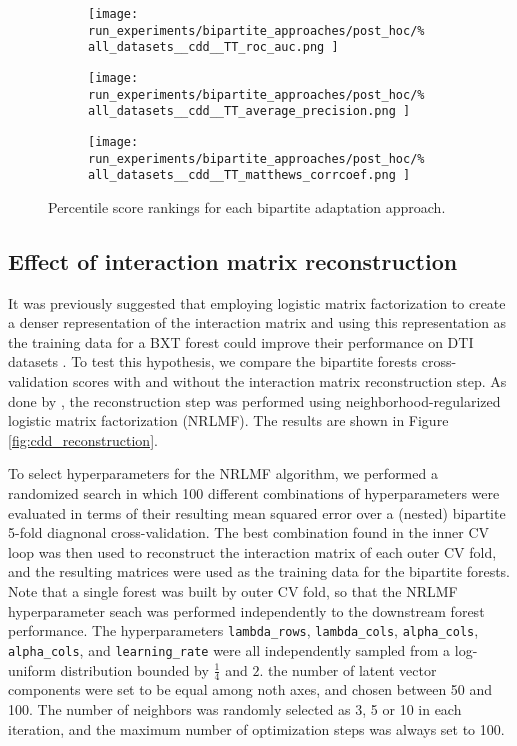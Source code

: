 \documentclass[conference]{IEEEtran}
\begin{document}
\begin{figure*}
    \begin{subfigure}{0.32\textwidth}
        \texttt{[image: 
            run\_experiments/bipartite\_approaches/post\_hoc/\%
            all\_datasets\_\_cdd\_\_TT\_roc\_auc.png
        ]}
    \end{subfigure}
    \begin{subfigure}{0.32\textwidth}
        \texttt{[image: 
            run\_experiments/bipartite\_approaches/post\_hoc/\%
            all\_datasets\_\_cdd\_\_TT\_average\_precision.png
        ]}
    \end{subfigure}
    \begin{subfigure}{0.32\textwidth}
        \texttt{[image: 
            run\_experiments/bipartite\_approaches/post\_hoc/\%
            all\_datasets\_\_cdd\_\_TT\_matthews\_corrcoef.png
        ]}
    \end{subfigure}
    \caption{Percentile score rankings for each bipartite adaptation approach.}
    \label{fig:cdd_adapters}
\end{figure*}

\subsection{Effect of interaction matrix reconstruction}

It was previously suggested that employing logistic matrix factorization to create a denser representation of the interaction matrix and using this representation as the training data for a BXT forest could improve their performance on DTI datasets \cite{Pliakos_2020}. To test this hypothesis, we compare the bipartite forests cross-validation scores with and without the interaction matrix reconstruction step. As done by \cite{Pliakos_2020}, the reconstruction step was performed using neighborhood-regularized logistic matrix factorization (NRLMF)\cite{}. The results are shown in Figure \ref{fig:cdd_reconstruction}.

To select hyperparameters for the NRLMF algorithm, we performed a randomized search in which 100 different combinations of hyperparameters were evaluated in terms of their resulting mean squared error over a (nested) bipartite 5-fold diagnonal cross-validation. The best combination found in the inner CV loop was then used to reconstruct the interaction matrix of each outer CV fold, and the resulting matrices were used as the training data for the bipartite forests. Note that a single forest was built by outer CV fold, so that the NRLMF hyperparameter seach was performed independently to the downstream forest performance. The hyperparameters \texttt{lambda\_rows}, \texttt{lambda\_cols}, \texttt{alpha\_cols}, \texttt{alpha\_cols}, and \texttt{learning\_rate} were all independently sampled from a log-uniform distribution bounded by $\frac{1}{4}$ and $2$. the number of latent vector components were set to be equal among noth axes, and chosen between 50 and 100. The number of neighbors was randomly selected as 3, 5 or 10 in each iteration, and the maximum number of optimization steps was always set to 100.
\end{document}
